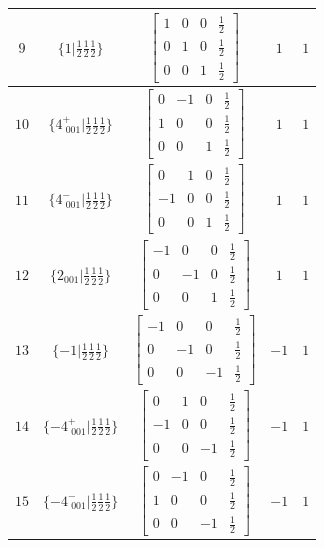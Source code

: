 \documentclass[fleqn,8pt]{jsarticle}
\begin{document}
\begin{longtable}{ccccc}
$ 9 $ & $ \{1|\frac{1}{2} \frac{1}{2} \frac{1}{2}\} $ & $ \begin{bmatrix} 1 & 0 & 0 & \frac{1}{2} \\ 0 & 1 & 0 & \frac{1}{2} \\ 0 & 0 & 1 & \frac{1}{2} \end{bmatrix} $ & $ 1 $ & $ 1 $ \\ \hline
$ 10 $ & $ \{4^{+}_{\,\,001}|\frac{1}{2} \frac{1}{2} \frac{1}{2}\} $ & $ \begin{bmatrix} 0 & -1 & 0 & \frac{1}{2} \\ 1 & 0 & 0 & \frac{1}{2} \\ 0 & 0 & 1 & \frac{1}{2} \end{bmatrix} $ & $ 1 $ & $ 1 $ \\ \hline
$ 11 $ & $ \{4^{-}_{\,\,001}|\frac{1}{2} \frac{1}{2} \frac{1}{2}\} $ & $ \begin{bmatrix} 0 & 1 & 0 & \frac{1}{2} \\ -1 & 0 & 0 & \frac{1}{2} \\ 0 & 0 & 1 & \frac{1}{2} \end{bmatrix} $ & $ 1 $ & $ 1 $ \\ \hline
$ 12 $ & $ \{2{}_{001}|\frac{1}{2} \frac{1}{2} \frac{1}{2}\} $ & $ \begin{bmatrix} -1 & 0 & 0 & \frac{1}{2} \\ 0 & -1 & 0 & \frac{1}{2} \\ 0 & 0 & 1 & \frac{1}{2} \end{bmatrix} $ & $ 1 $ & $ 1 $ \\ \hline
$ 13 $ & $ \{-1|\frac{1}{2} \frac{1}{2} \frac{1}{2}\} $ & $ \begin{bmatrix} -1 & 0 & 0 & \frac{1}{2} \\ 0 & -1 & 0 & \frac{1}{2} \\ 0 & 0 & -1 & \frac{1}{2} \end{bmatrix} $ & $ -1 $ & $ 1 $ \\ \hline
$ 14 $ & $ \{-4^{+}_{\,\,001}|\frac{1}{2} \frac{1}{2} \frac{1}{2}\} $ & $ \begin{bmatrix} 0 & 1 & 0 & \frac{1}{2} \\ -1 & 0 & 0 & \frac{1}{2} \\ 0 & 0 & -1 & \frac{1}{2} \end{bmatrix} $ & $ -1 $ & $ 1 $ \\ \hline
$ 15 $ & $ \{-4^{-}_{\,\,001}|\frac{1}{2} \frac{1}{2} \frac{1}{2}\} $ & $ \begin{bmatrix} 0 & -1 & 0 & \frac{1}{2} \\ 1 & 0 & 0 & \frac{1}{2} \\ 0 & 0 & -1 & \frac{1}{2} \end{bmatrix} $ & $ -1 $ & $ 1 $ \\ \hline

\end{longtable}
\end{document}
